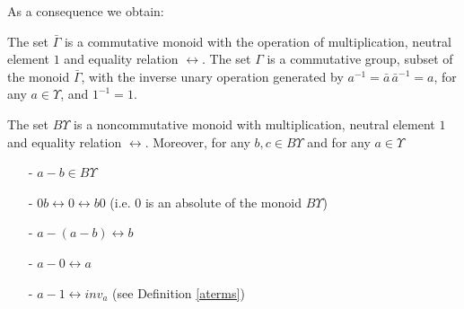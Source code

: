 As a consequence we obtain: 

\begin{proposition}
The set $\displaystyle \bar{\Gamma}$ is a commutative monoid with the operation of multiplication, neutral element $1$ and equality relation $\longleftrightarrow$. The set $\Gamma$ is a commutative group, subset of the monoid  $\displaystyle \bar{\Gamma}$, with the inverse unary operation generated by $\displaystyle a^{-1} = \bar{a} \, \bar{a}^{-1} = a$, for any $a \in \Upsilon$, and $\displaystyle 1^{-1} = 1$. 

The set $B\Upsilon$ is a noncommutative monoid with multiplication, neutral element $1$ and equality relation $\longleftrightarrow$. Moreover, for any $b, c \in B\Upsilon$ and for any $a \in \Upsilon$
\begin{enumerate}
\item[-] $a-b \in B\Upsilon$
\item[-] $0b \longleftrightarrow 0 \longleftrightarrow b0$ (i.e. $0$ is an absolute of the monoid $B\Upsilon$)
\item[-] $a-(a-b) \longleftrightarrow b$
\item[-] $a-0 \longleftrightarrow a$
\item[-] $\displaystyle a-1 \longleftrightarrow inv_{a}$ (see Definition \ref{aterms})
\end{enumerate}
\end{proposition}
